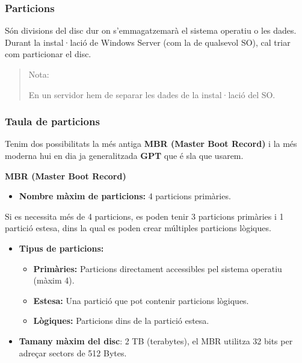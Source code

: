 \documentclass[
  a4paper,
]{article}
\providecommand{\tightlist}{%
  \setlength{\itemsep}{0pt}\setlength{\parskip}{0pt}}
\begin{document}
\subsubsection{Particions}\label{particions}

Són divisions del disc dur on s'emmagatzemarà el sistema operatiu o les
dades. Durant la instal·lació de Windows Server (com la de qualsevol
SO), cal triar com particionar el disc.

\begin{quote}
Nota:

En un servidor hem de separar les dades de la instal·lació del SO.
\end{quote}

\subsubsection{Taula de particions}\label{taula-de-particions}

Tenim dos possibilitats la més antiga \textbf{MBR (Master Boot Record)}
i la més moderna hui en dia ja generalitzada \textbf{GPT} que é sla que
usarem.

\textbf{MBR (Master Boot Record)}

\begin{itemize}
\tightlist
\item
  \textbf{Nombre màxim de particions:} 4 particions primàries.
\end{itemize}

Si es necessita més de 4 particions, es poden tenir 3 particions
primàries i 1 partició estesa, dins la qual es poden crear múltiples
particions lògiques.

\begin{itemize}
\item
  \textbf{Tipus de particions:}

  \begin{itemize}
  \item
    \textbf{Primàries:} Particions directament accessibles pel sistema
    operatiu (màxim 4).
  \item
    \textbf{Estesa:} Una partició que pot contenir particions lògiques.
  \item
    \textbf{Lògiques:} Particions dins de la partició estesa.
  \end{itemize}
\item
  \textbf{Tamany màxim del disc}: 2 TB (terabytes), el MBR utilitza 32
  bits per adreçar sectors de 512 Bytes.
\end{itemize}
\end{document}
